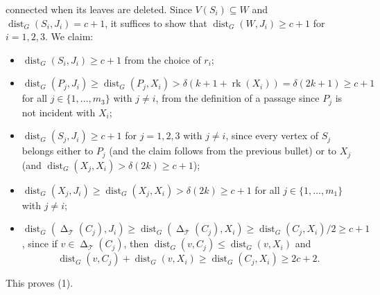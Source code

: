 \documentclass[titlepage,11pt]{article}
\def\LL{,\ldots,}
\newcommand{\dist}{\operatorname{dist}}
\newcommand{\voro}{\operatorname{\Delta}}
\newcommand{\rk}{\operatorname{rk}}
\newcommand{\mac}{\mathcal}
\begin{document}
	connected when its leaves are deleted. Since $V(S_i)\subseteq W$ and $\dist_G(S_i, J_i)=c+1$, it suffices to show that $\dist_G(W, J_i) \ge c+1$ for $i = 1,2,3$. We claim:
	\begin{itemize}
		\item $\dist_G(S_i,J_i)\ge c+1$ from the choice of $r_i$;
		\item $\dist_G(P_j, J_i) \ge \dist_G(P_j, X_i)> \delta(k+1+\rk(X_i))=\delta(2k+1)\ge c+1$
		for all $j\in \{1\LL m_3\}$ with $j\ne i$, from the definition of a passage since $P_j$ is not incident with $X_i$;
		\item $\dist_G(S_j, J_i)\ge c+1$ for $j=1,2,3$ with $j\ne i$, since every vertex of $S_j$ belongs either to $P_j$
		(and the claim follows from the previous bullet) or to $X_j$ (and $\dist_G(X_j,X_i)> \delta(2k)\ge c+1$);
		\item $\dist_G(X_j, J_i)\ge \dist_G(X_j,X_i)> \delta(2k)\ge c+1$ for all $j\in \{1\LL m_1\}$ with $j\ne i$;
		\item $\dist_G(\voro_{\mac T}(C_j), J_i)\ge \dist_G(\voro_{\mac T}(C_j), X_i)\ge \dist_G(C_j, X_i)/2\ge c+1$, since
		if $v\in \voro_{\mac T}(C_j)$, then $\dist_G(v,C_j)\le \dist_G(v, X_i)$ and 
		$$\dist_G(v,C_j) + \dist_G(v, X_i)\ge \dist_G(C_j, X_i)\ge 2c+2.$$
	\end{itemize}
	This proves (1).
	
	
	\bigskip
	
\end{document}
